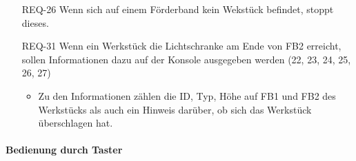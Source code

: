 \begin{itemize}
    \item[REQ-26] Wenn sich auf einem Förderband kein Wekstück befindet, stoppt dieses.
    \item[REQ-31] Wenn ein Werkstück die Lichtschranke am Ende von FB2 erreicht, sollen Informationen dazu auf der Konsole ausgegeben werden (22, 23, 24, 25, 26, 27)
    \begin{itemize}
        \item Zu den Informationen zählen die ID, Typ, Höhe auf FB1 und FB2 des Werkstücks als auch ein Hinweis darüber, ob sich das Werkstück überschlagen hat.
    \end{itemize}
\end{itemize}

\paragraph{Bedienung durch Taster}
